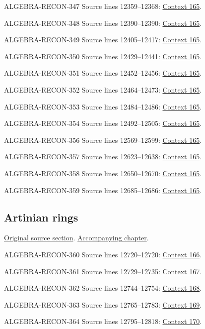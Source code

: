 \begin{AlgebraSourceRoutes}
\item[ALGEBRA-RECON-347] Source lines 12359--12368: \hyperlink{algebra-context-165}{Context 165}.
\item[ALGEBRA-RECON-348] Source lines 12390--12390: \hyperlink{algebra-context-165}{Context 165}.
\item[ALGEBRA-RECON-349] Source lines 12405--12417: \hyperlink{algebra-context-165}{Context 165}.
\item[ALGEBRA-RECON-350] Source lines 12429--12441: \hyperlink{algebra-context-165}{Context 165}.
\item[ALGEBRA-RECON-351] Source lines 12452--12456: \hyperlink{algebra-context-165}{Context 165}.
\item[ALGEBRA-RECON-352] Source lines 12464--12473: \hyperlink{algebra-context-165}{Context 165}.
\item[ALGEBRA-RECON-353] Source lines 12484--12486: \hyperlink{algebra-context-165}{Context 165}.
\item[ALGEBRA-RECON-354] Source lines 12492--12505: \hyperlink{algebra-context-165}{Context 165}.
\item[ALGEBRA-RECON-356] Source lines 12569--12599: \hyperlink{algebra-context-165}{Context 165}.
\item[ALGEBRA-RECON-357] Source lines 12623--12638: \hyperlink{algebra-context-165}{Context 165}.
\item[ALGEBRA-RECON-358] Source lines 12650--12670: \hyperlink{algebra-context-165}{Context 165}.
\item[ALGEBRA-RECON-359] Source lines 12685--12686: \hyperlink{algebra-context-165}{Context 165}.
\end{AlgebraSourceRoutes}

\subsection{Artinian rings}
\hypertarget{algebra-source-section-artinian}{}
\noindent\href{https://github.com/stacks/stacks-project/blob/a04446e57ec1fbc252a871afcec7752fb2807b14/algebra.tex\#L12699}{Original source section}. \href{algebra.pdf\#nameddest=section-artinian}{Accompanying chapter}.

\begin{AlgebraSourceRoutes}
\item[ALGEBRA-RECON-360] Source lines 12720--12720: \hyperlink{algebra-context-166}{Context 166}.
\item[ALGEBRA-RECON-361] Source lines 12729--12735: \hyperlink{algebra-context-167}{Context 167}.
\item[ALGEBRA-RECON-362] Source lines 12744--12754: \hyperlink{algebra-context-168}{Context 168}.
\item[ALGEBRA-RECON-363] Source lines 12765--12783: \hyperlink{algebra-context-169}{Context 169}.
\item[ALGEBRA-RECON-364] Source lines 12795--12818: \hyperlink{algebra-context-170}{Context 170}.
\end{AlgebraSourceRoutes}

